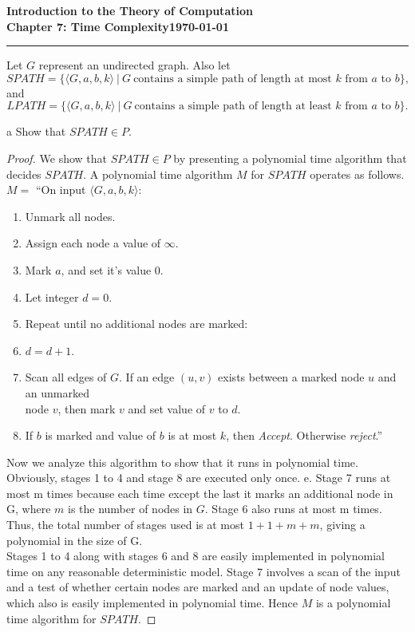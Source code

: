 \documentclass[11pt]{article}
\newcommand{\dated}{\today}
\begin{document}
\textbf{Introduction to the Theory of
Computation}\hfill\textbf{\myname}\\[0.01in]
\textbf{Chapter 7: Time Complexity}\hfill\textbf{\dated}\\
\smallskip\hrule\bigskip

\begin{problem}{7.21}
Let $G$ represent an undirected graph. Also let
\[
SPATH = \{\langle G, a, b, k \rangle \ | \ G \ \text{contains a simple path of length at most } k \text{ from } a \text{ to } b\},
\]
and
\[
LPATH = \{\langle G, a, b, k \rangle \ | \ G \ \text{contains a simple path of length at least } k \text{ from } a \text{ to } b\}.
\]
\end{problem}

\begin{problem}[Part]{a}
Show that $SPATH \in P$.
\end{problem}

\begin{proof}
We show that $SPATH \in P$ by presenting a polynomial time algorithm that decides $SPATH$. A polynomial time algorithm $M$ for $SPATH$ operates as follows. \\

$M =$ \textquotedblleft On input $\langle G, a, b, k \rangle$:
\begin{enumerate}
\item Unmark all nodes.
\item Assign each node a value of $\infty$.
\item Mark $a$, and set it's value 0.
\item Let integer $d = 0$.
\item Repeat until no additional nodes are marked:
\item \hspace*{0.5cm} $d = d + 1$.
\item \hspace*{0.5cm} Scan all edges of $G$. If an edge $(u, v)$ exists between a marked node $u$ and an unmarked \\
 \hspace*{0.5cm} node $v$, then mark $v$ and set value of $v$ to $d$.
\item If $b$ is marked and value of $b$ is at most $k$, then \textit{Accept}. Otherwise \textit{reject}.\textquotedblright
\end{enumerate}
Now we analyze this algorithm to show that it runs in polynomial time. Obviously, stages 1 to 4 and stage 8 are executed only once. e. Stage 7 runs at most m times because each time except the last it marks an additional node in G, where $m$ is the number of nodes in $G$. Stage 6 also runs at most m times. Thus, the total number of stages used is at most $1 + 1 + m + m$, giving a polynomial in the size of G. \\

Stages 1 to 4 along with stages 6 and 8 are easily implemented in polynomial time on any reasonable deterministic model. Stage 7 involves a scan of the input and a test of
whether certain nodes are marked and an update of node values, which also is easily implemented in polynomial time. Hence $M$ is a polynomial time algorithm for $SPATH$.
\end{proof}
\end{document}
